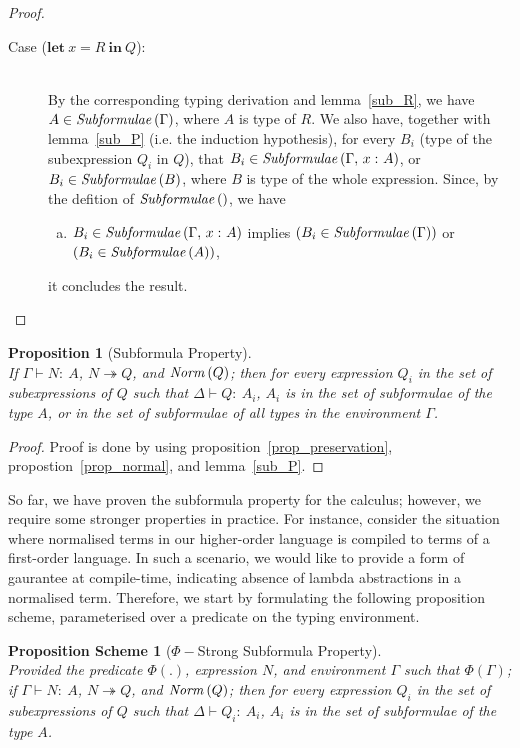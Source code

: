 \documentclass[11p,a4paper]{article}
\newcommand{\typecolor}{}
\newcommand{\termcolor}{}
\newcommand{\tp}[1]{{\typecolor #1}}
\newcommand{\tm}[1]{{\termcolor #1}}
\newtheorem{proposition}[theorem]{Proposition}
\newtheorem{scheme}[theorem]{Proposition Scheme}
\newcommand{\expshr}[3]{\mathbf{let}\ #1\boldsymbol{=}#2\ \mathbf{in}\ #3}
\newcommand{\typing}[2]{\tm{#1:\ }\tp{#2}}
\newcommand{\typenvcon}[2]{\tp{\Gamma,}\ \typing{#1}{#2}}
\newcommand{\txt}[1]{\text{\textit{#1}}}
\newcommand{\reducestar}[3]{#1 \overset{#2}\twoheadrightarrow #3}
\newcommand{\subformulae}[1]{\txt{Subformulae}\,(#1)}
\newcommand{\norm}[1]{\txt{Norm}\,(#1)}
\begin{document}
\begin{proof}
\begin{description}
\item[Case ($\expshr{x}{R}{Q}$):]\ \\
  By the corresponding typing derivation and lemma~\ref{sub_R}, we
  have $A \in \subformulae{\Gamma}$, where $A$ is type of $R$. We also
  have, together with lemma~\ref{sub_P} (i.e. the induction
  hypothesis), for every $B_i$ (type of the subexpression $Q_i$ in
  $Q$), that $B_i \in \subformulae{\typenvcon{x}{A}}$, or $B_i \in
  \subformulae{B}$, where $B$ is type of the whole expression. Since, by the defition of $\subformulae{}$, we have
  \begin{enumerate}[(a)] 
     \item $B_i \in \subformulae{\typenvcon{x}{A}}$ implies $(B_i \in \subformulae{\Gamma})$ or $(B_i \in \subformulae{A})$,
  \end{enumerate}
  it concludes the result.
\end{description}
\end{proof}

\begin{proposition}[Subformula Property]\ \\
\label{prop_subformula}
If $\Gamma \vdash \typing{N}{A}$, $\reducestar{N}{}{Q}$, and $\norm{Q}$;
then for every expression $Q_i$ in the set of subexpressions of $Q$ such
that $\Delta \vdash \typing{Q}{A_i}$, $A_i$ is in the set of subformulae of
the type $A$, or in the set of subformulae of all types in the
environment $\Gamma$.
\end{proposition}
\begin{proof}
Proof is done by using proposition~\ref{prop_preservation},
propostion~\ref{prop_normal}, and lemma~\ref{sub_P}.
\end{proof}

So far, we have proven the subformula property for the calculus;
however, we require some stronger properties in practice. For
instance, consider the situation where normalised terms in our
higher-order language is compiled to terms of a first-order
language. In such a scenario, we would like to provide a form of
gaurantee at compile-time, indicating absence of lambda abstractions
in a normalised term. Therefore, we start by formulating the following
proposition scheme, parameterised over a predicate on the typing
environment.

\begin{scheme}[$\Phi-$Strong Subformula Property]\ \\
\label{sub_scheme}
Provided the predicate $\Phi(.)$, expression $N$, and environment
$\Gamma$ such that $\Phi(\Gamma)$; if $\Gamma \vdash \typing{N}{A}$,
$\reducestar{N}{}{Q}$, and $\norm{Q}$; then for every expression $Q_i$
in the set of subexpressions of $Q$ such that $\Delta \vdash
\typing{Q_i}{A_i}$, $A_i$ is in the set of subformulae of the type
$A$.
\end{scheme}
\end{document}

